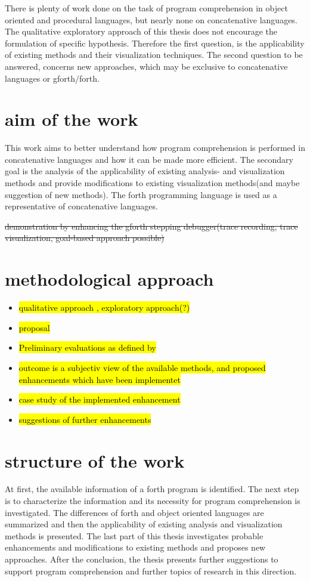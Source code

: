 There is plenty of work done on the task of program comprehension in object oriented and procedural languages\cite{Cornelissen:2009:SSP:1638616.1639301}, but nearly none on concatenative languages. The qualitative exploratory approach of this thesis does not encourage the formulation of specific hypothesis. Therefore the first question, is the applicability of existing methods and their visualization techniques. The second question to be answered, concerns new approaches, which may be exclusive to concatenative languages or gforth/forth.

\section{aim of the work}

This work aims to better understand how program comprehension is performed in concatenative languages and how it can be made more efficient. The secondary goal is the analysis of the applicability of existing analysis- and visualization methods and provide modifications to existing visualization methods(and maybe suggestion of new methods). The forth programming language is used as a representative of concatenative languages.

\sout{demonstration by enhancing the gforth stepping debugger(trace recording, trace visualization, goal-based approach possible)}

\section{methodological approach}

\begin{itemize}
\item \hl{qualitative approach , exploratory approach(?)}
\item \hl{proposal}
\item \hl{Preliminary evaluations as defined by} \cite{Cornelissen:2009:SSP:1638616.1639301}
\item \hl{outcome is a subjectiv view of the available methods, and proposed enhancements which have been implementet}
\item \hl{case study of the implemented enhancement}
\item \hl{suggestions of further enhancements}
\end{itemize}

\section{structure of the work}

At first, the available information of a forth program is identified. The next step is to characterize the information and its necessity for program comprehension is investigated. The differences of forth and object oriented languages are summarized and then the applicability of existing analysis and visualization methods is presented.
The last part of this thesis investigates probable enhancements and modifications to existing methods and proposes new approaches.
After the conclusion, the thesis presents further suggestions to support program comprehension and further topics of research in this direction.
